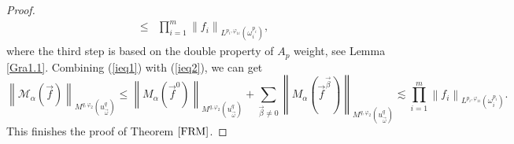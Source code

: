 \documentclass[11pt, twoside, leqno]{article}
\begin{document}
\begin{proof}[Proof]
\begin{align}
	\le&\prod\limits_{i = 1}^m {{{\left\| {{f_i}} \right\|}_{{L^{{p_i},{\varphi _{1i}}}}(\omega _i^{{p_i}})}}},
	\end{align}
	where the third step is based on the double property of $A_{p}$ weight, see Lemma \ref{Gra1.1}. Combining (\ref{ieq1}) with (\ref{ieq2}), we can get 
	\begin{equation*}
	{\left\| {{\mathcal{M}_\alpha }(\vec f)} \right\|_{{M^{q,{\varphi _2}}}(u_{\vec \omega }^q)}} \le {\left\| {{M_\alpha }({{\vec f}^0})} \right\|_{{M^{q,{\varphi _2}}}(u_{\vec \omega }^q)}} + \sum\limits_{\vec \beta  \ne 0} {{{\left\| {{M_\alpha }({{\vec f}^{\vec \beta }})} \right\|}_{{M^{q,{\varphi _2}}}(u_{\vec \omega }^q)}}} \lesssim \prod\limits_{i = 1}^m {{{\left\| {{f_i}} \right\|}_{{L^{{p_i},{\varphi _{1i}}}}(\omega _i^{{p_i}})}}}. 
	\end{equation*}
	This finishes the proof of Theorem $\ref{FRM}$.
\end{proof}
\end{document}
